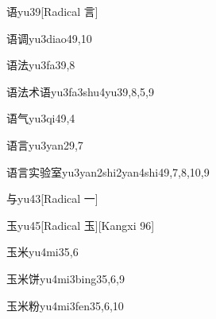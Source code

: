 \begin{verbete}{语}{yu3}{9}[Radical 言]
\end{verbete}

\begin{verbete}{语调}{yu3diao4}{9,10}
\end{verbete}

\begin{verbete}{语法}{yu3fa3}{9,8}
\end{verbete}

\begin{verbete}{语法术语}{yu3fa3shu4yu3}{9,8,5,9}
\end{verbete}

\begin{verbete}{语气}{yu3qi4}{9,4}
\end{verbete}

\begin{verbete}{语言}{yu3yan2}{9,7}
\end{verbete}

\begin{verbete}{语言实验室}{yu3yan2shi2yan4shi4}{9,7,8,10,9}
\end{verbete}

\begin{verbete}{与}{yu4}{3}[Radical 一]
\end{verbete}

\begin{verbete}{玉}{yu4}{5}[Radical 玉][Kangxi 96]
\end{verbete}

\begin{verbete}{玉米}{yu4mi3}{5,6}
\end{verbete}

\begin{verbete}{玉米饼}{yu4mi3bing3}{5,6,9}
\end{verbete}

\begin{verbete}{玉米粉}{yu4mi3fen3}{5,6,10}
\end{verbete}

